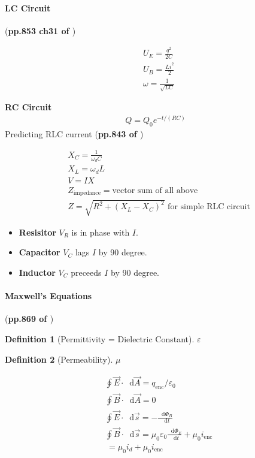 \documentclass{article}
\newcommand*\diff{\mathop{}\!\mathrm{d}}
\numberwithin{equation}{subsection} %
\newtheorem{defi}{Definition}[section]
\theoremstyle{definition}
\begin{document}
\paragraph{LC Circuit} (\textbf{pp.853 ch31 of \cite{book}})

\begin{align}
    & U_E = \frac{q^2}{2C} \\
    & U_B = \frac{L i^2}{2} \\
    & \omega = \frac{1}{\sqrt{LC}}
\end{align}

\textbf{RC Circuit}
\begin{align}
    Q = Q_0 e^{-t/(RC)}
\end{align}
Predicting RLC current (\textbf{pp.843 of \cite{book}})

\begin{align}
    & X_C = \frac{1}{\omega_d C} \\
    & X_L = \omega_d L \\
    & V = I X \\
    & Z_\text{impedance} = \text{vector sum of all above} \\
    & Z = \sqrt{R^2+(X_L-X_C)^2}  \text{ for simple RLC circuit}
\end{align}
\begin{itemize}
    \item \textbf{Resisitor} $V_R$ is in phase with $I$.
    \item \textbf{Capacitor} $V_C$ lags $I$ by 90 degree.
    \item \textbf{Inductor} $V_C$ preceeds $I$ by 90 degree.
\end{itemize}
\paragraph{Maxwell's Equations} (\textbf{pp.869 of \cite{book}})

\begin{defi}[Permittivity = Dielectric Constant]
    $\varepsilon$
\end{defi}
\begin{defi}[Permeability]
    $\mu$
\end{defi}
\begin{align}
    & \oint \vec{E} \cdot \diff \vec{A} = q_\text{enc}/\varepsilon_0
    \\
    & \oint \vec{B} \cdot\diff\vec{A} = 0 \\
    & \oint \vec{E}\cdot\diff\vec{s} = -\frac{\diff\Phi_B}{\diff t} \\
    & \oint \vec{B}\cdot\diff\vec{s} = 
    \mu_0\varepsilon_0 \frac{\diff\Phi_E}{\diff t} +\mu_0 i_\text{enc}
    \nonumber\\
    & \,= \mu_0 i_d + \mu_0 i_\text{enc}
\end{align}
\end{document}
